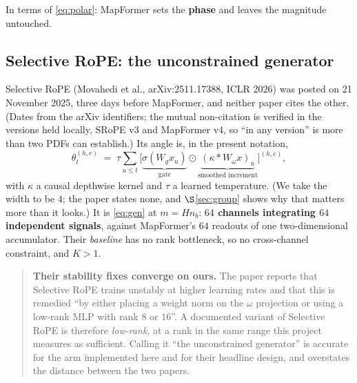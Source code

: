 \documentclass[11pt]{article}
\newcommand{\nb}{n_b}
\begin{document}
\medskip
\noindent In terms of \eqref{eq:polar}: MapFormer sets the \textbf{phase} and
leaves the magnitude untouched.

\subsection{Selective RoPE: the unconstrained generator}

Selective RoPE (Movahedi et al., arXiv:2511.17388, ICLR 2026) was posted on 21
November 2025, three days before MapFormer, and neither paper cites the other.
(Dates from the arXiv identifiers; the mutual non-citation is verified in the
versions held locally, SRoPE v3 and MapFormer v4, so ``in any version'' is more
than two PDFs can establish.) Its angle is, in the present notation,
\begin{equation}
  \label{eq:srope}
  \theta_t^{(h,c)}
  \;=\;\tau\sum_{u\le t}
  \Big[\underbrace{\sigma\!\left(W_g x_u\right)}_{\text{gate}}\odot
       \underbrace{\left(\kappa * W_\omega x\right)_u}_{\text{smoothed increment}}\Big]^{(h,c)},
\end{equation}
with $\kappa$ a causal depthwise kernel and $\tau$ a learned temperature. (We take
the width to be $4$; the paper states none, and $\S$\ref{sec:group} shows why that
matters more than it looks.) It is \eqref{eq:gen} at $m = H\nb$: \textbf{$64$ channels integrating
$64$ independent signals}, against MapFormer's $64$ readouts of one
two-dimensional accumulator. Their \emph{baseline} has no rank bottleneck, so no
cross-channel constraint, and $K>1$.

\begin{quote}\small
\textbf{Their stability fixes converge on ours.} The paper reports that Selective
RoPE trains unstably at higher learning rates and that this is remedied ``by either
placing a weight norm on the $\omega$ projection or using a low-rank MLP with rank
$8$ or $16$''. A documented variant of Selective RoPE is therefore \emph{low-rank},
at a rank in the same range this project measures as sufficient. Calling it ``the
unconstrained generator'' is accurate for the arm implemented here and for their
headline design, and overstates the distance between the two papers.
\end{quote}
\end{document}
